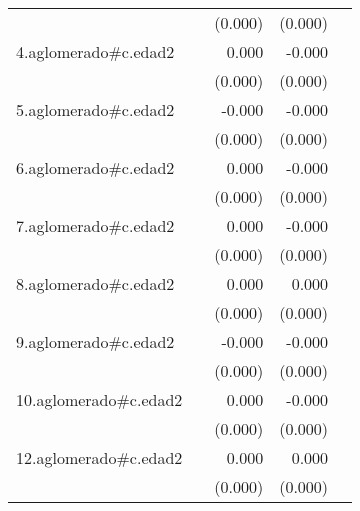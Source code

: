 {\begin{longtable}{l*{4}{D{.}{.}{-1}}}
            &                     &     (0.000)         &     (0.000)         &                     \\
\addlinespace
4.aglomerado#c.edad2&                     &       0.000         &      -0.000\sym{**} &                     \\
            &                     &     (0.000)         &     (0.000)         &                     \\
\addlinespace
5.aglomerado#c.edad2&                     &      -0.000         &      -0.000\sym{**} &                     \\
            &                     &     (0.000)         &     (0.000)         &                     \\
\addlinespace
6.aglomerado#c.edad2&                     &       0.000         &      -0.000         &                     \\
            &                     &     (0.000)         &     (0.000)         &                     \\
\addlinespace
7.aglomerado#c.edad2&                     &       0.000         &      -0.000         &                     \\
            &                     &     (0.000)         &     (0.000)         &                     \\
\addlinespace
8.aglomerado#c.edad2&                     &       0.000\sym{**} &       0.000\sym{*}  &                     \\
            &                     &     (0.000)         &     (0.000)         &                     \\
\addlinespace
9.aglomerado#c.edad2&                     &      -0.000         &      -0.000\sym{***}&                     \\
            &                     &     (0.000)         &     (0.000)         &                     \\
\addlinespace
10.aglomerado#c.edad2&                     &       0.000         &      -0.000         &                     \\
            &                     &     (0.000)         &     (0.000)         &                     \\
\addlinespace
12.aglomerado#c.edad2&                     &       0.000\sym{*}  &       0.000         &                     \\
            &                     &     (0.000)         &     (0.000)         &                     \\

\end{longtable}}
